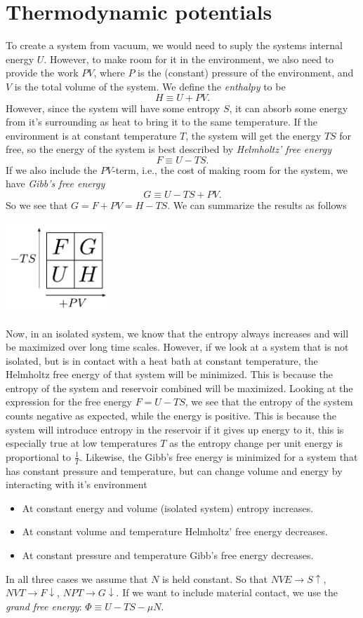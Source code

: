\documentclass[a4paper, 11pt, notitlepage, english]{article}
\begin{document}
\section*{Thermodynamic potentials}

To create a system from vacuum, we would need to suply the systems internal energy $U$. However, to make room for it in the environment, we also need to provide the work $PV$, where $P$ is the (constant) pressure of the environment, and $V$ is the total volume of the system. We define the \emph{enthalpy} to be 
$$H \equiv U + PV.$$
However, since the system will have some entropy $S$, it can absorb some energy from it's surrounding as heat to bring it to the same temperature. If the environment is at constant temperature $T$, the system will get the energy $TS$ for free, so the energy of the system is best described by \emph{Helmholtz' free energy}
$$F \equiv U - TS.$$
If we also include the $PV$-term, i.e., the cost of making room for the system, we have \emph{Gibb's free energy}
$$G \equiv U - TS + PV.$$
So we see that $G = F + PV = H - TS$. We can summarize the results as follows
\begin{center}
\includegraphics[width=0.3\textwidth]{potentials}
\end{center}

Now, in an isolated system, we know that the entropy always increases and will be maximized over long time scales. However, if we look at a system that is not isolated, but is in contact with a heat bath at constant temperature, the Helmholtz free energy of that system will be minimized. This is because the entropy of the system and reservoir combined will be maximized. Looking at the expression for the free energy $F = U - TS$, we see that the entropy of the system counts negative as expected, while the energy is positive. This is because the system will introduce entropy in the reservoir if it gives up energy to it, this is especially true at low temperatures $T$ as the entropy change per unit energy is proportional to $\frac{1}{T}$. Likewise, the Gibb's free energy is minimized for a system that has constant pressure and temperature, but can change volume and energy by interacting with it's environment
\begin{itemize}
	\item At constant energy and volume (isolated system) entropy increases.
	\item At constant volume and temperature Helmholtz' free energy decreases.
	\item At constant pressure and temperature Gibb's free energy decreases.
\end{itemize}
In all three cases we assume that $N$ is held constant. So that $NVE \to S\uparrow$, $NVT \to F\downarrow$, $NPT\to G\downarrow$. If we want to include material contact, we use the \emph{grand free energy}: $\Phi \equiv U - TS - \mu N$.
\end{document}
